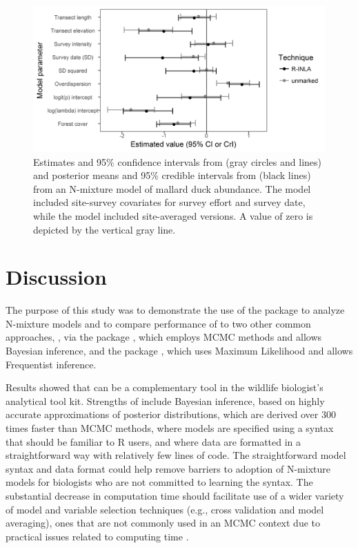\documentclass[article]{jss}
\begin{document}
\begin{figure}
  \includegraphics[width=\linewidth]{fig3.png}
  \caption{Estimates and 95\% confidence intervals from  (gray circles and lines) and posterior means and 95\% credible intervals from  (black lines) from an N-mixture model of mallard duck abundance.  The  model included site-survey covariates for survey effort and survey date, while the  model included site-averaged versions.  A value of zero is depicted by the vertical gray line.}
  \label{fig:fig3}
\end{figure}

\section[Discussion]{Discussion}
The purpose of this study was to demonstrate the use of the  package \citep{Rue_Martino_Lindgren_Simpson_Riebler_2013} to analyze N-mixture models and to compare performance of  to two other common approaches,  \citep{Lunn_Jackson_Best_Thomas_Spiegelhalter_2012}, via the  package \citep{Denwood_2016}, which employs MCMC methods and allows Bayesian inference, and the  package \citep{Fiske_Chandler_others_2011}, which uses Maximum Likelihood and allows Frequentist inference.

Results showed that  can be a complementary tool in the wildlife biologist's analytical tool kit. Strengths of  include Bayesian inference, based on highly accurate approximations of posterior distributions, which are derived over 300 times faster than MCMC methods, where models are specified using a syntax that should be familiar to R users, and where data are formatted in a straightforward way with relatively few lines of code. The straightforward model syntax and data format could help remove  barriers to adoption of N-mixture models for biologists who are not committed to learning the  syntax. The substantial decrease in computation time should facilitate use of a wider variety of model and variable selection techniques (e.g., cross validation and model averaging), ones that are not commonly used in an MCMC context due to practical issues related to computing time \citep{Kery_Schaub_2011}.
\end{document}
